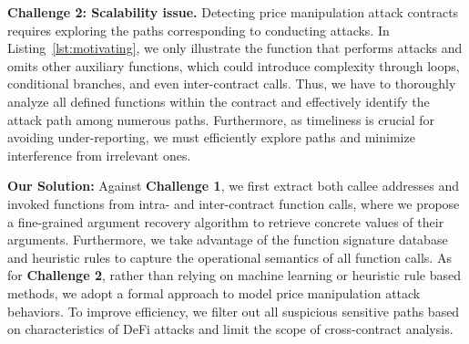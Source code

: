 \noindent
\textbf{Challenge 2: Scalability issue.}
Detecting price manipulation attack contracts requires exploring the paths corresponding to conducting attacks. In Listing~\ref{lst:motivating}, we only illustrate the function that performs attacks and omits other auxiliary functions, which could introduce complexity through loops, conditional branches, and even inter-contract calls.
Thus, we have to thoroughly analyze all defined functions within the contract and effectively identify the attack path among numerous paths.
Furthermore, as timeliness is crucial for avoiding under-reporting, we must efficiently explore paths and minimize interference from irrelevant ones.



\noindent
\textbf{Our Solution:}
Against \textbf{Challenge 1}, we first extract both callee addresses and invoked functions from intra- and inter-contract function calls, where we propose a fine-grained argument recovery algorithm to retrieve concrete values of their arguments.
Furthermore, we take advantage of the function signature database and heuristic rules to capture the operational semantics of all function calls.
As for \textbf{Challenge 2}, rather than relying on machine learning or heuristic rule based methods, we adopt a formal approach to model price manipulation attack behaviors. To improve efficiency, we filter out all suspicious sensitive paths based on characteristics of DeFi attacks and limit the scope of cross-contract analysis.

